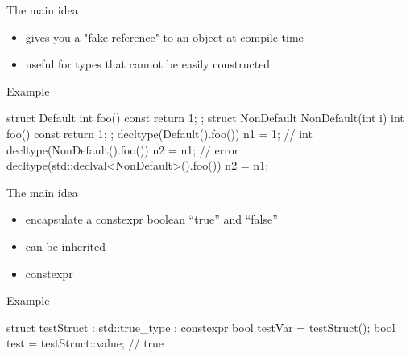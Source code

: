 \begin{frame}[fragile]
  \begin{block}{The main idea}
    \begin{itemize}
    \item gives you a "fake reference" to an object at compile time
    \item useful for types that cannot be easily constructed
    \end{itemize}
  \end{block}
  \begin{exampleblock}{Example}
    \begin{cppcode*}{}
      struct Default {
        int foo() const { return 1; }
      };
      struct NonDefault {
        NonDefault(int i) { }
        int foo() const { return 1; }
      }; 
      decltype(Default().foo()) n1 = 1;     // int
      decltype(NonDefault().foo()) n2 = n1; // error
      decltype(std::declval<NonDefault>().foo()) n2 = n1;
    \end{cppcode*}
  \end{exampleblock}  
\end{frame}

\begin{frame}[fragile]
  \begin{block}{The main idea}
    \begin{itemize}
    \item encapsulate a constexpr boolean ``true'' and ``false''
    \item can be inherited
    \item constexpr
    \end{itemize}
  \end{block}
  \begin{exampleblock}{Example}
    \begin{cppcode*}{}
      struct testStruct : std::true_type { };
      constexpr bool testVar = testStruct();
      bool test = testStruct::value; // true
    \end{cppcode*}
  \end{exampleblock}  
\end{frame}

